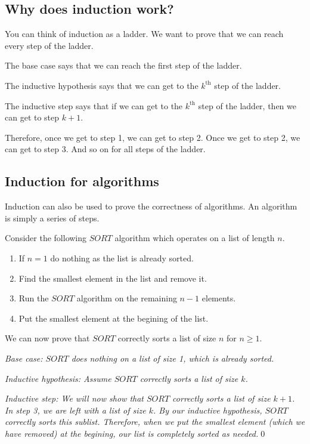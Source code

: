 \documentclass[12pt,letterpaper]{article}
\begin{document}
	\subsection*{Why does induction work?}

	You can think of induction as a ladder. We want to prove that we can reach every step of the ladder.

	The base case says that we can reach the first step of the ladder.

	The inductive hypothesis says that we can get to the $k^{\text{th}}$ step of the ladder.

	The inductive step says that if we can get to the $k^{\text{th}}$ step of the ladder, then we can get to step $k+1$. 

	Therefore, once we get to step 1, we can get to step 2. Once we get to step 2, we can get to step 3. And so on for all steps of the ladder.

	\subsection*{Induction for algorithms}
	
	Induction can also be used to prove the correctness of algorithms. An algorithm is simply a series of steps. 

	Consider the following $SORT$ algorithm which operates on a list of length $n$.
	\begin{enumerate}
		\item If $n=1$ do nothing as the list is already sorted.
		\item Find the smallest element in the list and remove it.
		\item Run the $SORT$ algorithm on the remaining $n-1$ elements.
		\item Put the smallest element at the begining of the list. 
	\end{enumerate}

	We can now prove that $SORT$ correctly sorts a list of size $n$ for $n \geq 1$. 
	

        \textit{Base case: $SORT$ does nothing on a list of size 1, which is already sorted.} 

        \textit{Inductive hypothesis: Assume $SORT$ correctly sorts a list of size $k$.}

	   \textit{Inductive step: We will now show that $SORT$ correctly sorts a list of size $k+1$. In step 3, we are left with a list of size $k$. By our inductive hypothesis, $SORT$ correctly sorts this sublist. Therefore, when we put the smallest element (which we have removed) at the begining, our list is completely sorted as needed.}\qed
\end{document}
